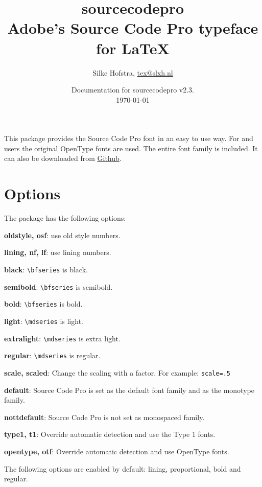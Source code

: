 \documentclass[11pt,a4paper,english]{article}
\title{\bfseries
	\Huge sourcecodepro\\
	\Large Adobe's Source Code Pro typeface for \LaTeX
}
\author{Silke Hofstra, \href{mailto:tex@slxh.nl}{tex@slxh.nl}}
\date{Documentation for sourcecodepro v2.3.\\ \today}
\begin{document}
\maketitle
\begin{multicols}{2}
This package provides the Source Code Pro font in an easy to use way. For  and  users the original OpenType fonts are used. The entire font family is included. It can also be downloaded from \href{https://github.com/adobe/source-code-pro}{Github}.

\section{Options}
The package has the following options:
\begin{itemize*}
	\item \textbf{oldstyle, osf}:  use old style numbers.
	\item \textbf{lining, nf, lf}: use lining numbers.
	\item \textbf{black}:          \texttt{\textbackslash bfseries} is black.
	\item \textbf{semibold}:       \texttt{\textbackslash bfseries} is semibold.
	\item \textbf{bold}:           \texttt{\textbackslash bfseries} is bold.
	\item \textbf{light}:          \texttt{\textbackslash mdseries} is light.
	\item \textbf{extralight}:     \texttt{\textbackslash mdseries} is extra light.
	\item \textbf{regular}:        \texttt{\textbackslash mdseries} is regular.
	\item \textbf{scale, scaled}:  Change the scaling with a factor. For example:  \texttt{scale=.5}
	\item \textbf{default}:        Source Code Pro is set as the default font family and as the monotype family.
	\item \textbf{nottdefault}:    Source Code Pro is not set as monospaced family.
	\item \textbf{type1, t1}:      Override automatic detection and use the Type 1 fonts.
	\item \textbf{opentype, otf}:  Override automatic detection and use OpenType fonts.
\end{itemize*}
The following options are enabled by default: lining, proportional, bold and regular.


\end{multicols}
\end{document}

